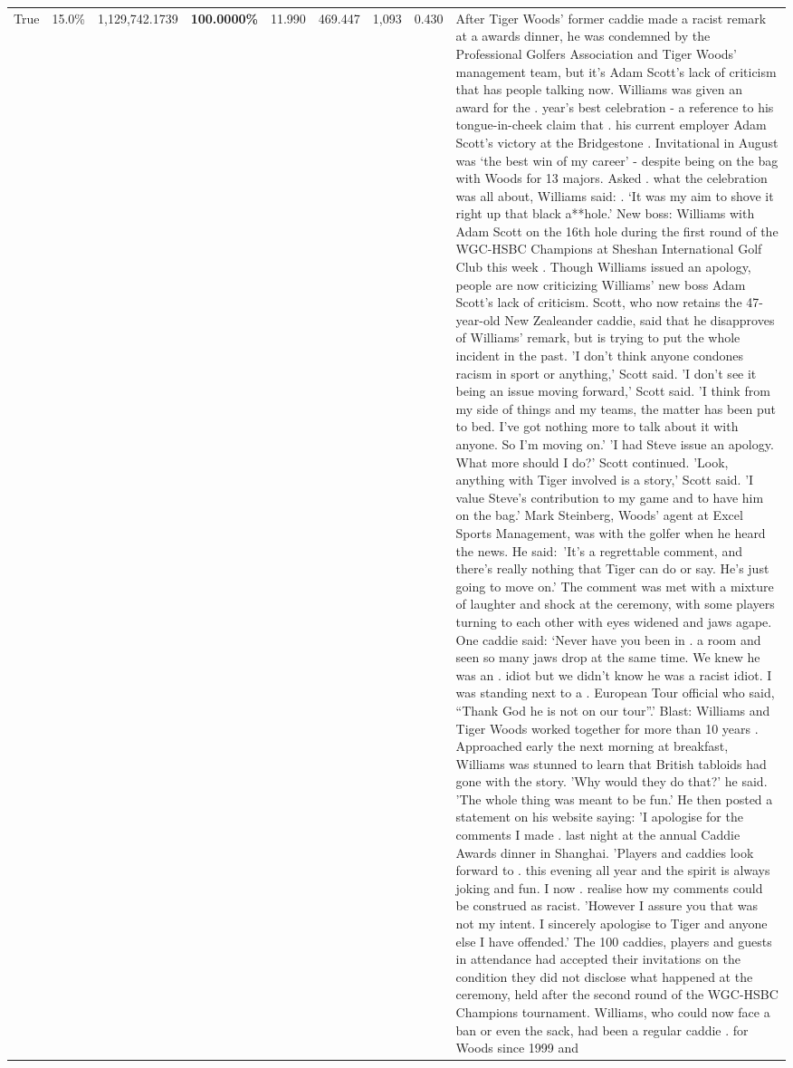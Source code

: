\begin{table}[H]
\begin{tabular}{lllrlllll}
True & 15.0\% & 1,129,742.1739 & \bfseries \color{red} 100.0000\% & 11.990 & 469.447 & 1,093 & 0.430 & After Tiger Woods' former caddie made a racist remark at a awards dinner, he was condemned by the Professional Golfers Association and Tiger Woods' management team, but it's Adam Scott's lack of criticism that has people talking now. Williams was given an award for the . year’s best celebration - a reference to his tongue-in-cheek claim that . his current employer Adam Scott’s victory at the Bridgestone . Invitational in August was ‘the best win of my career’ - despite being on the bag with Woods for 13 majors. Asked . what the celebration was all about, Williams said: . ‘It was my aim to shove it right up that black a**hole.’ New boss: Williams with Adam Scott  on the 16th hole during the first round of the WGC-HSBC Champions at Sheshan International Golf Club this week . Though Williams issued an apology, people are now criticizing Williams' new boss Adam Scott's lack of criticism. Scott, who now retains the 47-year-old New Zealeander caddie, said that he disapproves of Williams' remark, but is trying to put the whole incident in the past. 'I don't think anyone condones racism in sport or anything,' Scott said. 'I don't see it being an issue moving forward,' Scott said. 'I think from my side of things and my teams, the matter has been put to bed. I've got nothing more to talk about it with anyone. So I'm moving on.' 'I had Steve issue an apology. What more should I do?' Scott continued. 'Look, anything with Tiger involved is a story,' Scott said. 'I value Steve's contribution to my game and to have him on the bag.' Mark Steinberg, Woods' agent at Excel Sports Management, was with the golfer when he heard the news. He said: 'It's a regrettable comment, and there's really nothing that Tiger can do or say. He's just going to move on.' The comment was met with a mixture of laughter and shock at the ceremony, with some players turning to each other with eyes widened and jaws agape. One caddie said: ‘Never have you been in . a room and seen so many jaws drop at the same time. We knew he was an . idiot but we didn’t know he was a racist idiot. I was standing next to a . European Tour official who said, “Thank God he is not on our tour”.’ Blast: Williams and Tiger Woods worked together for more than 10 years . Approached early the next morning at breakfast, Williams was stunned to learn that British tabloids had gone with the story. 'Why would they do that?' he said. 'The whole thing was meant to be fun.' He then posted a statement on his website saying: 'I apologise for the comments I made . last night at the annual Caddie Awards dinner in Shanghai. 'Players and caddies look forward to . this evening all year and the spirit is always joking and fun. I now . realise how my comments could be construed as racist. 'However I assure you that was not my intent. I sincerely apologise to Tiger and anyone else I have offended.' The 100 caddies, players and guests in attendance had accepted their invitations on the condition they did not disclose what happened at the ceremony, held after the second round of the WGC-HSBC Champions tournament. Williams, who could now face a ban or even the sack, had been a regular caddie . for Woods since 1999 and 
\end{tabular}
\end{table}
